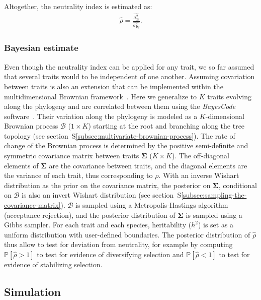 \documentclass{article}
\newcommand{\UniDimArray}[1]{\bm{#1}}
\newcommand{\BiDimArray}[1]{\bm{#1}}
\newcommand{\proba}{\mathbb{P}}
\newcommand{\Heritability}{h^2}
\newcommand{\RateBetween}{\sigma^2_{\mathrm{B}}}
\newcommand{\RateWhithin}{\sigma^2_{\mathrm{W}}}
\newcommand{\EstRateBetween}{\widehat{\RateBetween}}
\newcommand{\EstRateWhithin}{\widehat{\RateWhithin}}
\newcommand{\NI}{\rho}
\newcommand{\EstNI}{\widehat{\rho}}
\newcommand{\Ntrait}{K}
\newcommand{\Covariancematrix}{\Sigma}
\newcommand{\CovarianceMatrix}{\BiDimArray{\Covariancematrix}}
\newcommand{\brownian}{\mathcal{B}}
\newcommand{\Brownian}{\UniDimArray{\brownian}}
\begin{document}
Altogether, the neutrality index is estimated as:
\begin{gather}
    \EstNI = \frac{\EstRateBetween}{\EstRateWhithin}. \label{eq:estimated-NI}
\end{gather}

\subsubsection*{Bayesian estimate}

Even though the neutrality index can be applied for any trait, we so far assumed that several traits would to be independent of one another.
Assuming covariation between traits is also an extension that can be implemented within the multidimensional Brownian framework~\cite{huelsenbeck_detecting_2003, lartillot_phylogenetic_2011, lartillot_joint_2012, latrille_inferring_2021}.
Here we generalize to $\Ntrait$ traits evolving along the phylogeny and are correlated between them using the \textit{BayesCode} software~\cite{latrille_inferring_2021}.
Their variation along the phylogeny is modeled as a $\Ntrait$-dimensional Brownian process $\Brownian$ ($1 \times \Ntrait$) starting at the root and branching along the tree topology (see section~S\ref{subsec:multivariate-brownian-process}).
The rate of change of the Brownian process is determined by the positive semi-definite and symmetric covariance matrix between traits $\CovarianceMatrix$ ($\Ntrait \times \Ntrait$).
The off-diagonal elements of $\CovarianceMatrix$ are the covariance between traits, and the diagonal elements are the variance of each trait, thus corresponding to $\NI$.
With an inverse Wishart distribution as the {prior} on the covariance matrix, the {posterior} on $\CovarianceMatrix$, conditional on $\brownian$ is also an invert Wishart distribution (see section~S\ref{subsec:sampling-the-covariance-matrix}).
$\Brownian$ is sampled using a Metropolis-Hastings algorithm (acceptance rejection), and the posterior distribution of $\CovarianceMatrix$ is sampled using a Gibbs sampler.
For each trait and each species, heritability ($\Heritability$) is set as a uniform distribution with user-defined boundaries.
The posterior distribution of $\EstNI$ thus allow to test for deviation from neutrality, for example by computing $\proba [\EstNI > 1 ]$ to test for evidence of diversifying selection and $\proba [\EstNI < 1 ]$ to test for evidence of stabilizing selection.

\subsection*{Simulation}\label{subsec:simulations}
\end{document}
